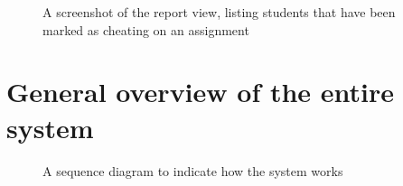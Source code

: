\documentclass[11pt,a4paper]{article}
\begin{document}
\begin{figure}[h!]
  \caption{A screenshot of the report view, listing students that have been
  marked as cheating on an assignment}
  \label{fig:graphview}
\end{figure}


\section{General overview of the entire system}

\begin{figure}[h!]
  \caption{A sequence diagram to indicate how the system works}
  \label{fig:sequencediagram}
\end{figure}
\end{document}
